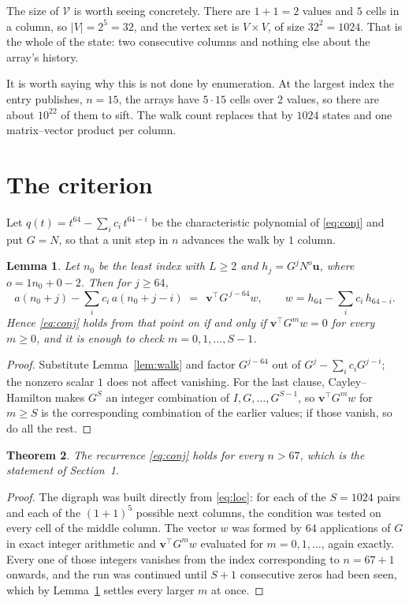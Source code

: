 \documentclass[11pt,a4paper]{article}
\theoremstyle{plain}
\newtheorem{theorem}{Theorem}
\newtheorem{lemma}[theorem]{Lemma}
\theoremstyle{definition}
\begin{document}
The size of $\mathcal V$ is worth seeing concretely. There are $1+1=2$ values
and $5$ cells in a column, so $|V|=2^{5}=32$, and the vertex set is
$V\times V$, of size $32^2=1024$. That is the whole of the state: two consecutive
columns and nothing else about the array's history.

It is worth saying why this is not done by enumeration. At the largest index the entry
publishes, $n=15$, the arrays have $5\cdot15$ cells over
$2$ values, so there are about $10^{22}$ of them to sift. The
walk count replaces that by $1024$ states and one matrix--vector product per column.
\section{The criterion}

Let $q(t)=t^{64}-\sum_i c_i\,t^{64-i}$ be the characteristic polynomial of
\eqref{eq:conj} and put $G=N$, so that a unit step in $n$ advances the walk by
$1$ column.

\begin{lemma}\label{lem:crit}
Let $n_0$ be the least index with $L\ge2$ and $h_j=G^{j}N^{o}\mathbf{u}$, where
$o=1n_0+0-2$. Then for $j\ge64$,
\[
a(n_0+j)-\sum_i c_i\,a(n_0+j-i)\;=\;\,\mathbf{v}^{\!\top}G^{\,j-64}w,
\qquad w=h_{64}-\sum_i c_i\,h_{64-i} .
\]
Hence \eqref{eq:conj} holds from that point on if and only if
$\mathbf{v}^{\!\top}G^{m}w=0$ for every $m\ge0$, and it is enough to check
$m=0,1,\dots,S-1$.
\end{lemma}

\begin{proof}
Substitute Lemma~\ref{lem:walk} and factor $G^{j-64}$ out of
$G^{j}-\sum_ic_iG^{j-i}$; the nonzero scalar $1$ does not affect
vanishing. For the last clause, Cayley--Hamilton makes $G^{S}$ an integer combination of
$I,G,\dots,G^{S-1}$, so $\mathbf{v}^{\!\top}G^{m}w$ for $m\ge S$ is the corresponding
combination of the earlier values; if those vanish, so do all the rest.
\end{proof}

\begin{theorem}
The recurrence \eqref{eq:conj} holds for every $n>67$, which is the statement of
Section~1.
\end{theorem}

\begin{proof}
The digraph was built directly from \eqref{eq:loc}: for each of the $S=1024$ pairs and each
of the $(1+1)^{5}$ possible next columns, the condition was tested on every cell of
the middle column. The vector $w$ was formed by $64$ applications of $G$ in exact integer
arithmetic and $\mathbf{v}^{\!\top}G^{m}w$ evaluated for $m=0,1,\dots$, again exactly.
Every one of those integers vanishes from the index corresponding to $n=67+1$ onwards,
and the run was continued until $S+1$ consecutive zeros had been seen, which by
Lemma~\ref{lem:crit} settles every larger $m$ at once.
\end{proof}
\end{document}

